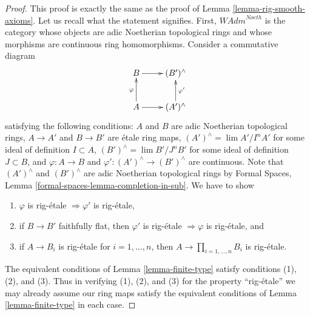 \documentclass[10pt,a4paper]{amsart}
\theoremstyle{plain}
\theoremstyle{definition}
\theoremstyle{remark}
\numberwithin{equation}{subsection}
\def\lim{\mathop{\mathrm{lim}}\nolimits}
\begin{document}
\begin{proof}
This proof is exactly the same as the proof of
Lemma \ref{lemma-rig-smooth-axioms}.
Let us recall what the statement signifies. First, 
$\textit{WAdm}^{Noeth}$ is the category whose objects are
adic Noetherian topological rings and whose morphisms are
continuous ring homomorphisms. Consider a commutative diagram
$$
\xymatrix{
B \ar[r] & (B')^\wedge \\
A \ar[r] \ar[u]^\varphi & (A')^\wedge \ar[u]_{\varphi'}
}
$$
satisfying the following conditions:
$A$ and $B$ are adic Noetherian topological rings,
$A \to A'$ and $B \to B'$ are \'etale ring maps,
$(A')^\wedge = \lim A'/I^nA'$ for some ideal of definition $I \subset A$,
$(B')^\wedge = \lim B'/J^nB'$ for some ideal of definition $J \subset B$, and
$\varphi : A \to B$ and $\varphi' : (A')^\wedge \to (B')^\wedge$
are continuous. Note that $(A')^\wedge$ and $(B')^\wedge$ are
adic Noetherian topological rings by
Formal Spaces, Lemma \ref{formal-spaces-lemma-completion-in-sub}.
We have to show
\begin{enumerate}
\item $\varphi$ is rig-\'etale $\Rightarrow \varphi'$ is rig-\'etale,
\item if $B \to B'$ faithfully flat, then $\varphi'$ is rig-\'etale
$\Rightarrow \varphi$ is rig-\'etale, and
\item if $A \to B_i$ is rig-\'etale for $i = 1, \ldots, n$, then
$A \to \prod_{i = 1, \ldots, n} B_i$ is rig-\'etale.
\end{enumerate}
The equivalent conditions of Lemma \ref{lemma-finite-type} satisfy
conditions (1), (2), and (3).
Thus in verifying (1), (2), and (3) for the property
``rig-\'etale'' we may already assume our ring maps satisfy
the equivalent conditions of Lemma \ref{lemma-finite-type}
in each case.


\end{proof}
\end{document}
